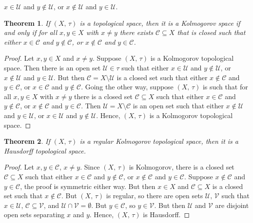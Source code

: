 \documentclass{article}
\theoremstyle{plain}
\newtheorem{theorem}{Theorem}[section]
\theoremstyle{normal}
\begin{document}
        $x\in\mathcal{U}$ and $y\not\in\mathcal{U}$, or
        $x\not\in\mathcal{U}$ and $y\in\mathcal{U}$.
        \begin{theorem}
            If $(X,\,\tau)$ is a topological space, then it is a Kolmogorov
            space if and only if for all $x,y\in{X}$ with $x\ne{y}$ there
            exists $\mathcal{C}\subseteq{X}$ that is closed such that either
            $x\in\mathcal{C}$ and $y\notin\mathcal{C}$, or
            $x\notin\mathcal{C}$ and $y\in\mathcal{C}$.
        \end{theorem}
        \begin{proof}
            Let $x,y\in{X}$ and $x\ne{y}$. Suppose $(X,\,\tau)$ is a Kolmogorov
            topological space. Then there is an open set $\mathcal{U}\in\tau$
            such that either $x\in\mathcal{U}$ and $y\notin\mathcal{U}$, or
            $x\notin\mathcal{U}$ and $y\in\mathcal{U}$. But then
            $\mathcal{C}=X\setminus\mathcal{U}$ is a closed set such that either
            $x\notin\mathcal{C}$ and $y\in\mathcal{C}$, or
            $x\in\mathcal{C}$ and $y\notin\mathcal{C}$. Going the other way,
            suppose $(X,\,\tau)$ is such that for all $x,y\in{X}$ with
            $x\ne{y}$ there is a closed set $\mathcal{C}\subseteq{X}$ such
            that either $x\in\mathcal{C}$ and $y\notin\mathcal{C}$, or
            $x\notin\mathcal{C}$ and $y\in\mathcal{C}$. Then
            $\mathcal{U}=X\setminus\mathcal{C}$ is an open set such that either
            $x\notin\mathcal{U}$ and $y\in\mathcal{U}$, or
            $x\in\mathcal{U}$ and $y\notin\mathcal{U}$. Hence,
            $(X,\,\tau)$ is a Kolmogorov topological space.
        \end{proof}
        \begin{theorem}
            If $(X,\,\tau)$ is a regular Kolmogorov topological space, then
            it is a Hausdorff topological space.
        \end{theorem}
        \begin{proof}
            Let $x,y\in\mathcal{C}$, $x\ne{y}$. Since $(X,\,\tau)$ is
            Kolmogorov, there is a closed set $\mathcal{C}\subseteq{X}$ such
            that either $x\in\mathcal{C}$ and $y\notin\mathcal{C}$, or
            $x\notin\mathcal{C}$ and $y\in\mathcal{C}$. Suppose
            $x\notin\mathcal{C}$ and $y\in\mathcal{C}$, the proof is symmetric
            either way. But then $x\in{X}$ and $\mathcal{C}\subseteq{X}$ is a
            closed set such that $x\notin\mathcal{C}$. But $(X,\,\tau)$ is
            regular, so there are open sets $\mathcal{U},\,\mathcal{V}$ such
            that $x\in\mathcal{U}$, $\mathcal{C}\subseteq\mathcal{V}$, and
            $\mathcal{U}\cap\mathcal{V}=\emptyset$. But
            $y\in\mathcal{C}$, so $y\in\mathcal{V}$. But then $\mathcal{U}$
            and $\mathcal{V}$ are disjoint open sets separating $x$ and $y$.
            Hence, $(X,\,\tau)$ is Hausdorff.
        \end{proof}
\end{document}
